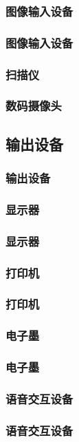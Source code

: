 \documentclass{beamer}
\begin{document}
\subsubsection{图像输入设备}
\begin{frame}
	\frametitle{图像输入设备}

\end{frame}

\begin{frame}
	\frametitle{扫描仪}

\end{frame}

\begin{frame}
	\frametitle{数码摄像头}

\end{frame}

\subsection{输出设备}
\begin{frame}
	\frametitle{输出设备}

\end{frame}

\subsubsection{显示器}
\begin{frame}
	\frametitle{显示器}

\end{frame}

\subsubsection{打印机}
\begin{frame}
	\frametitle{打印机}

\end{frame}

\subsubsection{电子墨}
\begin{frame}
	\frametitle{电子墨}

\end{frame}

\subsubsection{语音交互设备}
\begin{frame}
	\frametitle{语音交互设备}

\end{frame}
\end{document}
